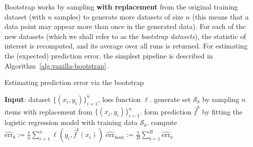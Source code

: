 \documentclass{article}
\begin{document}
Bootstrap works by sampling \textbf{with replacement} from the
original training dataset (with $n$ samples) to generate more datasets of
size $n$ (this means that a data point may appear more than once in the
generated data). For each of the new datasets (which we shall refer to as the
\textit{bootstrap datasets}), the statistic of interest is recomputed,
and its average over all runs is returned. For estimating the (expected)
prediction error, the simplest pipeline is described in
Algorithm~\ref{alg:vanilla-bootstrap}.
\begin{algorithm}
	\caption{Estimating prediction error via the bootstrap}
	\begin{algorithmic}[1]
		\State \textbf{Input}: dataset $\{(x_i, y_i)\}_{i=1}^n$, loss function
		$\ell$.
			\State generate set $\mathcal{S}_b$ by sampling $n$ items with
			replacement from $\{(x_i, y_i)\}_{i = 1}^n$.
			\State form prediction $\hat{f}^b$ by fitting the logistic
			regression model with training data $\mathcal{S}_b$.
			\State compute
			$\widehat{\mathrm{err}}_b := \frac{1}{n} \sum_{i=1}^n \ell(y_i,
			\hat{f}^b(x_i))$
		\EndFor
		\State \Return $\widehat{\mathrm{err}}_{\mathrm{boot}} :=
		\frac{1}{B} \sum_{b = 1}^B \widehat{\mathrm{err}}_b$
		\label{op:err-bootstrap}
	\end{algorithmic}
	\label{alg:vanilla-bootstrap}
\end{algorithm}

\newpage
\end{document}
